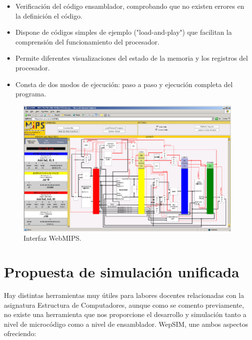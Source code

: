 \begin{itemize}
	
\item Verificación del código ensamblador, comprobando que no existen errores en la definición el código.

\item Dispone de códigos simples de ejemplo ("load-and-play") que facilitan la comprensión del funcionamiento del procesador.

\item Permite diferentes visualizaciones del estado de la memoria y los registros del procesador.

\item Consta de dos modos de ejecución: paso a paso y ejecución completa del programa.
	
\end{itemize}

\begin{figure}[htbp]
 	\centering
 	\includegraphics[width=12cm]{figures/webmips_figure}
 	\caption{ Interfaz WebMIPS.}
	\label{fig:webmips_figure}
\end{figure}

\clearpage

\section{Propuesta de simulación unificada}
\label{sec:propuesta_simulacion}
Hay distintas herramientas muy útiles para labores docentes relacionadas con la asignatura Estructura de Computadores, aunque como se comento previamente, no existe una herramienta que nos proporcione el desarrollo y simulación tanto a nivel de microcódigo como a nivel de ensamblador. WepSIM, une ambos aspectos ofreciendo:

